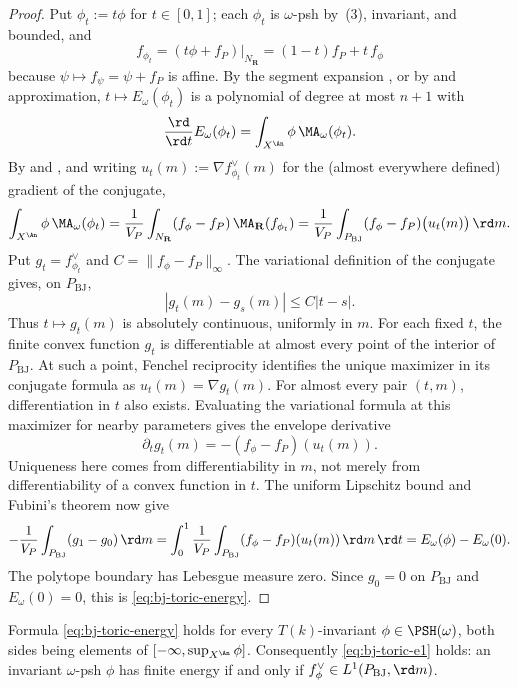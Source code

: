 \begin{proof}
Put $\phi_t:=t\phi$ for $t\in[0,1]$; each $\phi_t$ is
$\omega$-psh by \,(3), invariant, and
bounded, and
\[
 f_{\phi_t}=(t\phi+f_P)|_{N_{\mathbf R}}=(1-t)f_P+t\,f_\phi
\]
because $\psi\mapsto f_\psi=\psi+f_P$ is affine.  By the segment
expansion , or by
 and approximation, $t\mapsto
E_\omega(\phi_t)$ is a polynomial of degree at most $n+1$ with
\[
 \frac{\rd}{\rd t}E_\omega(\phi_t)=\int_{X^{\An}}\phi\,\MA_\omega(\phi_t).
\]
By  and
, and writing $u_t(m):=\nabla f_{\phi_t}^\vee(m)$
for the (almost everywhere defined) gradient of the conjugate,
\[
 \int_{X^{\An}}\phi\,\MA_\omega(\phi_t)
 =\frac1{V_P}\int_{N_{\mathbf R}}(f_\phi-f_P)\,\MA_{\mathbf R}(f_{\phi_t})
 =\frac1{V_P}\int_{P_{\mathrm{BJ}}}(f_\phi-f_P)\bigl(u_t(m)\bigr)\,\rd m .
\]
Put $g_t=f^\vee_{\phi_t}$ and $C=\|f_\phi-f_P\|_\infty$.
The variational definition of the conjugate gives, on $P_{\mathrm{BJ}}$,
\[
 |g_t(m)-g_s(m)|\le C|t-s|.
\]
Thus $t\mapsto g_t(m)$ is absolutely continuous, uniformly in $m$.
For each fixed $t$, the finite convex function $g_t$ is differentiable
at almost every point of the interior of $P_{\mathrm{BJ}}$.
At such a point, Fenchel reciprocity identifies the unique maximizer
in its conjugate formula as $u_t(m)=\nabla g_t(m)$.
For almost every pair $(t,m)$, differentiation in $t$ also exists.
Evaluating the variational formula at this maximizer for nearby
parameters gives the envelope derivative
\[
 \partial_t g_t(m)=-(f_\phi-f_P)(u_t(m)).
\]
Uniqueness here comes from differentiability in $m$, not merely from
differentiability of a convex function in $t$.
The uniform Lipschitz bound and Fubini's theorem now give
\[
 -\frac1{V_P}\int_{P_{\mathrm{BJ}}}(g_1-g_0)\,\rd m
 =\int_0^1\frac1{V_P}\int_{P_{\mathrm{BJ}}}
       (f_\phi-f_P)(u_t(m))\,\rd m\,\rd t
 =E_\omega(\phi)-E_\omega(0).
\]
The polytope boundary has Lebesgue measure zero.  Since $g_0=0$
on $P_{\mathrm{BJ}}$ and $E_\omega(0)=0$, this is
\eqref{eq:bj-toric-energy}.
\end{proof}

\begin{proposition}
\label{prop:ch49-toric-energy-singular}
Formula \eqref{eq:bj-toric-energy} holds for every $T(k)$-invariant
$\phi\in\PSH(\omega)$, both sides being elements of
$[-\infty,\sup_{X^{\An}}\phi]$.  Consequently
\eqref{eq:bj-toric-e1} holds: an invariant $\omega$-psh $\phi$ has
finite energy if and only if $f^\vee_\phi\in L^1(P_{\mathrm{BJ}},\rd m)$.
\end{proposition}

